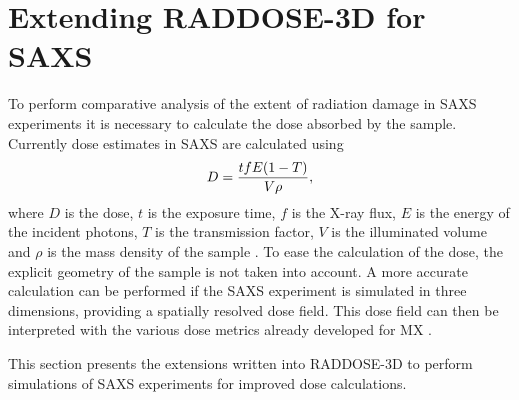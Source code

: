 \section{Extending RADDOSE-3D for SAXS}
\label{sec:Extending RADDOSE-3D for SAXS}
To perform comparative analysis of the extent of radiation damage in SAXS experiments it is necessary to calculate the dose absorbed by the sample.
Currently dose estimates in SAXS are calculated using
\begin{equation}
    D = \frac{tfE(1-T)}{V\rho},
\end{equation}
where $D$ is the dose, $t$ is the exposure time, $f$ is the X-ray flux, $E$ is the energy of the incident photons, $T$ is the transmission factor, $V$ is the illuminated volume and $\rho$ is the mass density of the sample \cite{meisburger2013breaking,jeffries2015limiting}.
To ease the calculation of the dose, the explicit geometry of the sample is not taken into account.
A more accurate calculation can be performed if the SAXS experiment is simulated in three dimensions, providing a spatially resolved dose field.
This dose field can then be interpreted with the various dose metrics already developed for MX \cite{zeldin2013dwd,zeldin2012}.

This section presents the extensions written into RADDOSE-3D to perform simulations of SAXS experiments for improved dose calculations.


